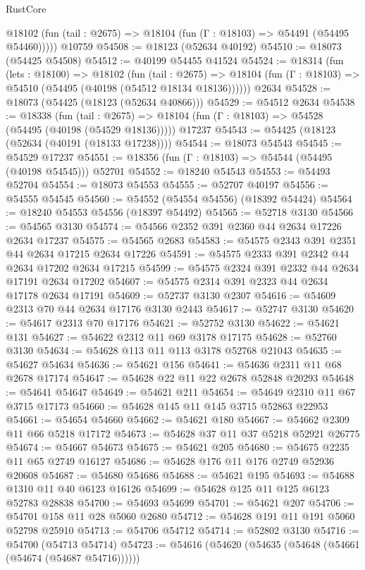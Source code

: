 \begin{lexlean}{RustCore}
\begin{coremodule}
      @18102 (fun (tail : @2675) => @18104 (fun (Γ : @18103) => @54491 (@54495 @54460)))))
    @10759
@54508 := @18123 (@52634 @40192)
@54510 := @18073 (@54425 @54508)
@54512 := @40199 @54455 @41524
@54524 := @18314
    (fun (lets : @18100) =>
    @18102
      (fun (tail : @2675) =>
      @18104 (fun (Γ : @18103) => @54510 (@54495 (@40198 (@54512 @18134 @18136))))))
    @2634
@54528 := @18073 (@54425 (@18123 (@52634 @40866)))
@54529 := @54512 @2634
@54538 := @18338
    (fun (tail : @2675) => @18104 (fun (Γ : @18103) => @54528 (@54495 (@40198 (@54529 @18136)))))
    @17237
@54543 := @54425 (@18123 (@52634 (@40191 (@18133 @17238))))
@54544 := @18073 @54543
@54545 := @54529 @17237
@54551 := @18356 (fun (Γ : @18103) => @54544 (@54495 (@40198 @54545))) @52701
@54552 := @18240 @54543
@54553 := @54493 @52704
@54554 := @18073 @54553
@54555 := @52707 @40197
@54556 := @54555 @54545
@54560 := @54552 (@54554 @54556) (@18392 @54424)
@54564 := @18240 @54553 @54556 (@18397 @54492)
@54565 := @52718 @3130
@54566 := @54565 @3130
@54574 := @54566 @2352 @391 @2360 @44 @2634 @17226 @2634 @17237
@54575 := @54565 @2683
@54583 := @54575 @2343 @391 @2351 @44 @2634 @17215 @2634 @17226
@54591 := @54575 @2333 @391 @2342 @44 @2634 @17202 @2634 @17215
@54599 := @54575 @2324 @391 @2332 @44 @2634 @17191 @2634 @17202
@54607 := @54575 @2314 @391 @2323 @44 @2634 @17178 @2634 @17191
@54609 := @52737 @3130 @2307
@54616 := @54609 @2313 @70 @44 @2634 @17176 @3130 @2443
@54617 := @52747 @3130
@54620 := @54617 @2313 @70 @17176
@54621 := @52752 @3130
@54622 := @54621 @131
@54627 := @54622 @2312 @11 @69 @3178 @17175
@54628 := @52760 @3130
@54634 := @54628 @113 @11 @113 @3178 @52768 @21043
@54635 := @54627 @54634
@54636 := @54621 @156
@54641 := @54636 @2311 @11 @68 @2678 @17174
@54647 := @54628 @22 @11 @22 @2678 @52848 @20293
@54648 := @54641 @54647
@54649 := @54621 @211
@54654 := @54649 @2310 @11 @67 @3715 @17173
@54660 := @54628 @145 @11 @145 @3715 @52863 @22953
@54661 := @54654 @54660
@54662 := @54621 @180
@54667 := @54662 @2309 @11 @66 @5218 @17172
@54673 := @54628 @37 @11 @37 @5218 @52921 @26775
@54674 := @54667 @54673
@54675 := @54621 @205
@54680 := @54675 @2235 @11 @65 @2749 @16127
@54686 := @54628 @176 @11 @176 @2749 @52936 @20608
@54687 := @54680 @54686
@54688 := @54621 @195
@54693 := @54688 @1310 @11 @40 @6123 @16126
@54699 := @54628 @125 @11 @125 @6123 @52783 @28838
@54700 := @54693 @54699
@54701 := @54621 @207
@54706 := @54701 @158 @11 @28 @5060 @2680
@54712 := @54628 @191 @11 @191 @5060 @52798 @25910
@54713 := @54706 @54712
@54714 := @52802 @3130
@54716 := @54700 (@54713 @54714)
@54723 := @54616 (@54620 (@54635 (@54648 (@54661 (@54674 (@54687 @54716))))))

\end{coremodule}
\end{lexlean}
